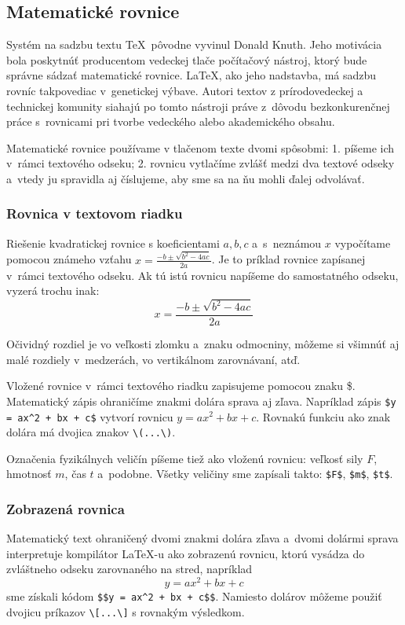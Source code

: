 \documentclass[../../../thesis.tex]{subfiles}
\begin{document}
\subsection{Matematické rovnice}
Systém na sadzbu textu \TeX\ pôvodne vyvinul Donald Knuth.
Jeho motivácia bola poskytnúť producentom vedeckej tlače
počítačový nástroj,
ktorý bude správne sádzať matematické rovnice.
\LaTeX, ako jeho nadstavba, má sadzbu rovníc takpovediac
v~genetickej výbave.
Autori textov z prírodovedeckej a technickej komunity siahajú po tomto nástroji
práve z~dôvodu bezkonkurenčnej práce s~rovnicami pri tvorbe
vedeckého alebo akademického obsahu.

Matematické rovnice používame v tlačenom texte dvomi spôsobmi:
1. píšeme ich v~rámci textového odseku;
2. rovnicu vytlačíme zvlášť medzi dva textové odseky
a~vtedy ju spravidla aj číslujeme, aby sme sa na ňu mohli
ďalej odvolávať.

\subsubsection{Rovnica v textovom riadku}
Riešenie kvadratickej rovnice s koeficientami $a,b,c$
a~s~neznámou $x$ vypočítame pomocou známeho vzťahu
$x=\frac{-b\pm\sqrt{b^2-4ac}}{2a}$.
Je to príklad rovnice zapísanej v~rámci textového odseku.
Ak tú istú rovnicu napíšeme do samostatného odseku,
vyzerá trochu inak:
$$
  x=\frac{-b\pm\sqrt{b^2-4ac}}{2a}
$$

Očividný rozdiel je vo veľkosti zlomku a~znaku odmocniny,
môžeme si všimnúť aj malé rozdiely v~medzerách,
vo vertikálnom zarovnávaní, atď.

Vložené rovnice v~rámci textového riadku zapisujeme pomocou
znaku \$.
Matematický zápis ohraničíme znakmi dolára sprava aj zľava.
Napríklad zápis \verb|$y = ax^2 + bx + c$| vytvorí rovnicu $y = ax^2 + bx + c$. Rovnakú funkciu ako znak dolára má dvojica znakov \verb|\(...\)|.

Označenia fyzikálnych veličín píšeme tiež ako vloženú rovnicu:
veľkosť sily $F$, hmotnosť $m$, čas $t$ a~podobne.
Všetky veličiny sme zapísali takto: \verb|$F$|,
\verb|$m$|, \verb|$t$|.

\subsubsection{Zobrazená rovnica}
Matematický text ohraničený dvomi znakmi dolára zľava
a~dvomi dolármi sprava interpretuje kompilátor \LaTeX-u
ako zobrazenú rovnicu, ktorú vysádza do zvláštneho odseku
zarovnaného na stred, napríklad
$$
  y = ax^2 + bx + c
$$
sme získali kódom \verb|$$y = ax^2 + bx + c$$|.
Namiesto dolárov môžeme použiť dvojicu príkazov
\verb|\[...\]| s rovnakým výsledkom.
\end{document}
